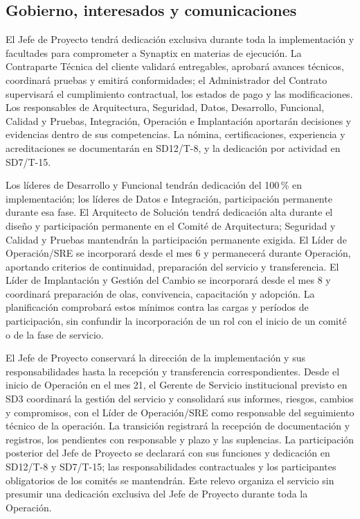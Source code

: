 \subsection{Gobierno, interesados y comunicaciones}
El Jefe de Proyecto tendrá dedicación exclusiva durante toda la implementación y facultades para comprometer a Synaptix en materias de ejecución. La Contraparte Técnica del cliente validará entregables, aprobará avances técnicos, coordinará pruebas y emitirá conformidades; el Administrador del Contrato supervisará el cumplimiento contractual, los estados de pago y las modificaciones. Los responsables de Arquitectura, Seguridad, Datos, Desarrollo, Funcional, Calidad y Pruebas, Integración, Operación e Implantación aportarán decisiones y evidencias dentro de sus competencias. La nómina, certificaciones, experiencia y acreditaciones se documentarán en SD12/T-8, y la dedicación por actividad en SD7/T-15. \parencites[art.~70, p.~37]{sd6-ba}[RT-19.02 y sec.~19.2, pp.~33--34]{sd6-bt}

Los líderes de Desarrollo y Funcional tendrán dedicación del 100\,\% en implementación; los líderes de Datos e Integración, participación permanente durante esa fase. El Arquitecto de Solución tendrá dedicación alta durante el diseño y participación permanente en el Comité de Arquitectura; Seguridad y Calidad y Pruebas mantendrán la participación permanente exigida. El Líder de Operación/SRE se incorporará desde el mes 6 y permanecerá durante Operación, aportando criterios de continuidad, preparación del servicio y transferencia. El Líder de Implantación y Gestión del Cambio se incorporará desde el mes 8 y coordinará preparación de olas, convivencia, capacitación y adopción. La planificación comprobará estos mínimos contra las cargas y períodos de participación, sin confundir la incorporación de un rol con el inicio de un comité o de la fase de servicio. \parencite[sec.~19.2, pp.~33--34]{sd6-bt}

El Jefe de Proyecto conservará la dirección de la implementación y sus responsabilidades hasta la recepción y transferencia correspondientes. Desde el inicio de Operación en el mes 21, el Gerente de Servicio institucional previsto en SD3 coordinará la gestión del servicio y consolidará sus informes, riesgos, cambios y compromisos, con el Líder de Operación/SRE como responsable del seguimiento técnico de la operación. La transición registrará la recepción de documentación y registros, los pendientes con responsable y plazo y las suplencias. La participación posterior del Jefe de Proyecto se declarará con sus funciones y dedicación en SD12/T-8 y SD7/T-15; las responsabilidades contractuales y los participantes obligatorios de los comités se mantendrán. Este relevo organiza el servicio sin presumir una dedicación exclusiva del Jefe de Proyecto durante toda la Operación. \parencites[art.~70, p.~37]{sd6-ba}[sec.~3.1.2.3, pp.~10--11]{sd6-sd3}


